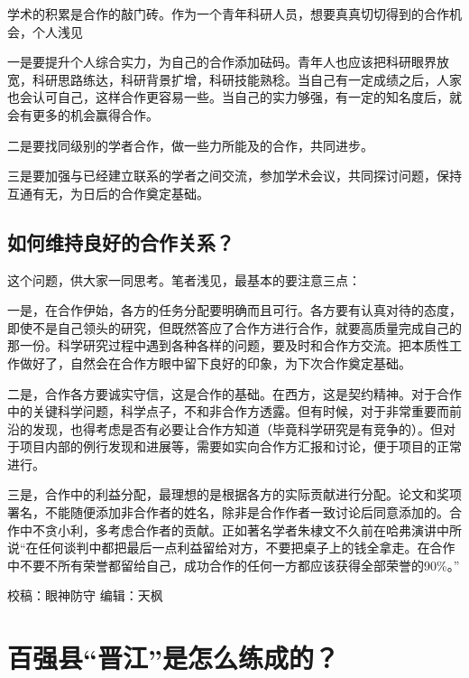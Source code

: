 \documentclass[]{book}
\begin{document}
学术的积累是合作的敲门砖。作为一个青年科研人员，想要真真切切得到的合作机会，个人浅见

一是要提升个人综合实力，为自己的合作添加砝码。青年人也应该把科研眼界放宽，科研思路练达，科研背景扩增，科研技能熟稔。当自己有一定成绩之后，人家也会认可自己，这样合作更容易一些。当自己的实力够强，有一定的知名度后，就会有更多的机会赢得合作。

二是要找同级别的学者合作，做一些力所能及的合作，共同进步。

三是要加强与已经建立联系的学者之间交流，参加学术会议，共同探讨问题，保持互通有无，为日后的合作奠定基础。

\hypertarget{ux5982ux4f55ux7ef4ux6301ux826fux597dux7684ux5408ux4f5cux5173ux7cfb}{%
\subsection{如何维持良好的合作关系？}\label{ux5982ux4f55ux7ef4ux6301ux826fux597dux7684ux5408ux4f5cux5173ux7cfb}}

这个问题，供大家一同思考。笔者浅见，最基本的要注意三点：

一是，在合作伊始，各方的任务分配要明确而且可行。各方要有认真对待的态度，即使不是自己领头的研究，但既然答应了合作方进行合作，就要高质量完成自己的那一份。科学研究过程中遇到各种各样的问题，要及时和合作方交流。把本质性工作做好了，自然会在合作方眼中留下良好的印象，为下次合作奠定基础。

二是，合作各方要诚实守信，这是合作的基础。在西方，这是契约精神。对于合作中的关键科学问题，科学点子，不和非合作方透露。但有时候，对于非常重要而前沿的发现，也得考虑是否有必要让合作方知道（毕竟科学研究是有竞争的）。但对于项目内部的例行发现和进展等，需要如实向合作方汇报和讨论，便于项目的正常进行。

三是，合作中的利益分配，最理想的是根据各方的实际贡献进行分配。论文和奖项署名，不能随便添加非合作者的姓名，除非是合作作者一致讨论后同意添加的。合作中不贪小利，多考虑合作者的贡献。正如著名学者朱棣文不久前在哈弗演讲中所说``在任何谈判中都把最后一点利益留给对方，不要把桌子上的钱全拿走。在合作中不要不所有荣誉都留给自己，成功合作的任何一方都应该获得全部荣誉的90\%。''

校稿：眼神防守
编辑：天枫

\hypertarget{ux767eux5f3aux53bfux664bux6c5fux662fux600eux4e48ux7ec3ux6210ux7684}{%
\section{百强县``晋江''是怎么练成的？}\label{ux767eux5f3aux53bfux664bux6c5fux662fux600eux4e48ux7ec3ux6210ux7684}}
\end{document}
